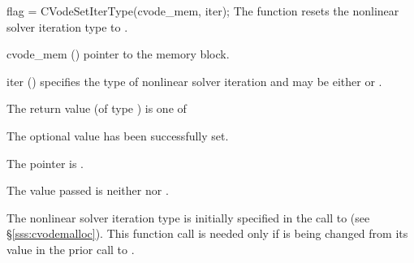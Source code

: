 {
flag = CVodeSetIterType(cvode\_mem, iter);
}
{
  The function  resets the nonlinear solver
  iteration type to .
}
{
  \begin{args}
  \item[cvode\_mem] ()
    pointer to the {\cvodes} memory block.
  \item[iter] ()
    specifies the type of nonlinear solver iteration and may be
    either  or . 
  \end{args}
}
{
  The return value  (of type ) is one of
  \begin{args}
  \item[\Id{CV\_SUCCESS}] 
    The optional value has been successfully set.
  \item[\Id{CV\_MEM\_NULL}]
    The  pointer is .
  \item[\Id{CV\_ILL\_INPUT}]
    The  value passed is neither  nor .
  \end{args}
}
{
  The nonlinear solver iteration type is initially specified in the call
  to  (see \S\ref{sss:cvodemalloc}). This function call is
  needed only if  is being changed from its value in the prior call 
  to .
}


